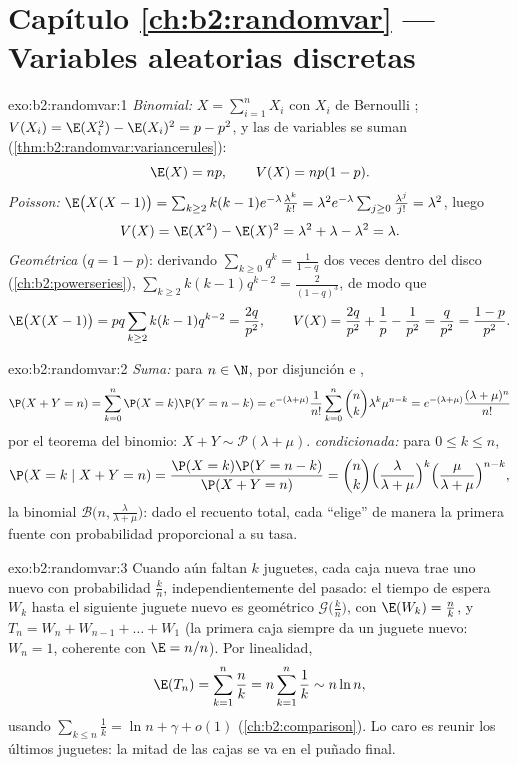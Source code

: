 \section*{Capítulo \ref{ch:b2:randomvar} --- Variables aleatorias discretas}

\begin{solution}{exo:b2:randomvar:1}
\emph{Binomial:} $X = \sum_{i=1}^n X_i$ con $X_i$ de Bernoulli
; $V(X_i) = \E(X_i^2) - \E(X_i)^2 = p - p^2$, y las
 de variables  se suman
(\cref{thm:b2:randomvar:variancerules}):
\[
\E(X) = np, \qquad V(X) = np(1-p) .
\]
\emph{Poisson:} $\E\bigl(X(X-1)\bigr) =
\sum_{k\geq2}k(k-1)e^{-\lambda}\frac{\lambda^k}{k!} = \lambda^2
e^{-\lambda}\sum_{j\geq0}\frac{\lambda^j}{j!} = \lambda^2$, luego
\[
V(X) = \E(X^2) - \E(X)^2
= \lambda^2 + \lambda - \lambda^2 = \lambda .
\]
\emph{Geométrica} ($q = 1 - p$): derivando $\sum_{k\geq0}q^k =
\frac{1}{1-q}$ dos veces dentro del disco
(\cref{ch:b2:powerseries}), $\sum_{k\geq2}k(k-1)q^{k-2} =
\frac{2}{(1-q)^3}$, de modo que
\[
\E\bigl(X(X-1)\bigr) = pq\sum_{k\geq2}k(k-1)q^{k-2}
= \frac{2q}{p^2},
\qquad
V(X) = \frac{2q}{p^2} + \frac1p - \frac{1}{p^2}
= \frac{q}{p^2} = \frac{1-p}{p^2} .
\]
\end{solution}

\begin{solution}{exo:b2:randomvar:2}
\emph{Suma:} para $n \in \N$, por disjunción e ,
\[
\P(X + Y = n)
= \sum_{k=0}^n \P(X = k)\P(Y = n - k)
= e^{-(\lambda + \mu)}\frac{1}{n!}
\sum_{k=0}^n \binom nk \lambda^k\mu^{n-k}
= e^{-(\lambda+\mu)}\frac{(\lambda + \mu)^n}{n!}
\]
por el teorema del binomio: $X + Y \sim \mathcal{P}(\lambda + \mu)$.
\emph{ condicionada:} para $0 \leq k \leq n$,
\[
\P(X = k \mid X + Y = n)
= \frac{\P(X = k)\P(Y = n - k)}{\P(X + Y = n)}
= \binom nk
\Bigl(\frac{\lambda}{\lambda+\mu}\Bigr)^{k}
\Bigl(\frac{\mu}{\lambda+\mu}\Bigr)^{n-k} ,
\]
la  binomial $\mathcal{B}\bigl(n,
\frac{\lambda}{\lambda+\mu}\bigr)$: dado el recuento total, cada
 ``elige'' de manera  la primera fuente con
probabilidad proporcional a su tasa.
\end{solution}

\begin{solution}{exo:b2:randomvar:3}
Cuando aún faltan $k$ juguetes, cada caja nueva trae uno nuevo con
probabilidad $\frac kn$, independientemente del pasado: el tiempo de
espera $W_k$ hasta el siguiente juguete nuevo es geométrico
$\mathcal{G}\bigl(\frac kn\bigr)$, con $\E(W_k) = \frac nk$, y $T_n =
W_n + W_{n-1} + \dots + W_1$ (la primera caja siempre da un juguete
nuevo: $W_n = 1$, coherente con $\E = n/n$). Por linealidad,
\[
\E(T_n) = \sum_{k=1}^n \frac nk = n\sum_{k=1}^n\frac1k
\sim n\ln n ,
\]
usando $\sum_{k\leq n}\frac1k = \ln n + \gamma + o(1)$
(\cref{ch:b2:comparison}). Lo caro es reunir los últimos juguetes: la
mitad de las cajas se va en el puñado final.
\end{solution}

